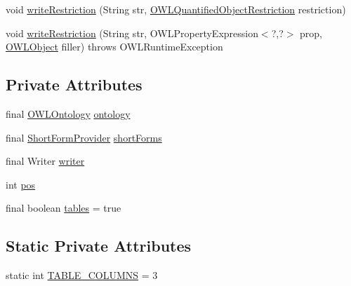 \begin{DoxyCompactItemize}
\item 
void \hyperlink{classuk_1_1ac_1_1manchester_1_1owl_1_1owlapi_1_1tutorialowled2011_1_1_o_w_l_tutorial_syntax_object_renderer_a53697d816997f4c2bdcb3e17cb0db5cc}{write\-Restriction} (String str, \hyperlink{interfaceorg_1_1semanticweb_1_1owlapi_1_1model_1_1_o_w_l_quantified_object_restriction}{O\-W\-L\-Quantified\-Object\-Restriction} restriction)
\item 
void \hyperlink{classuk_1_1ac_1_1manchester_1_1owl_1_1owlapi_1_1tutorialowled2011_1_1_o_w_l_tutorial_syntax_object_renderer_aca21aba92c5b7acac53d28a6ac6c66cf}{write\-Restriction} (String str, O\-W\-L\-Property\-Expression$<$?,?$>$ prop, \hyperlink{interfaceorg_1_1semanticweb_1_1owlapi_1_1model_1_1_o_w_l_object}{O\-W\-L\-Object} filler)  throws O\-W\-L\-Runtime\-Exception 
\end{DoxyCompactItemize}
\subsection*{Private Attributes}
\begin{DoxyCompactItemize}
\item 
final \hyperlink{interfaceorg_1_1semanticweb_1_1owlapi_1_1model_1_1_o_w_l_ontology}{O\-W\-L\-Ontology} \hyperlink{classuk_1_1ac_1_1manchester_1_1owl_1_1owlapi_1_1tutorialowled2011_1_1_o_w_l_tutorial_syntax_object_renderer_a8ecf6b5a156811b4fd6687fa5a99474c}{ontology}
\item 
final \hyperlink{interfaceorg_1_1semanticweb_1_1owlapi_1_1util_1_1_short_form_provider}{Short\-Form\-Provider} \hyperlink{classuk_1_1ac_1_1manchester_1_1owl_1_1owlapi_1_1tutorialowled2011_1_1_o_w_l_tutorial_syntax_object_renderer_a6a7a1b1bec7b17193bec82c11e896bd7}{short\-Forms}
\item 
final Writer \hyperlink{classuk_1_1ac_1_1manchester_1_1owl_1_1owlapi_1_1tutorialowled2011_1_1_o_w_l_tutorial_syntax_object_renderer_af9e3c9d1111b841a7e86b2ced68ff359}{writer}
\item 
int \hyperlink{classuk_1_1ac_1_1manchester_1_1owl_1_1owlapi_1_1tutorialowled2011_1_1_o_w_l_tutorial_syntax_object_renderer_a58e6c98acd19085e0c0671f150a96c89}{pos}
\item 
final boolean \hyperlink{classuk_1_1ac_1_1manchester_1_1owl_1_1owlapi_1_1tutorialowled2011_1_1_o_w_l_tutorial_syntax_object_renderer_abdeba02f3a15280c069224129565d778}{tables} = true
\end{DoxyCompactItemize}
\subsection*{Static Private Attributes}
\begin{DoxyCompactItemize}
\item 
static int \hyperlink{classuk_1_1ac_1_1manchester_1_1owl_1_1owlapi_1_1tutorialowled2011_1_1_o_w_l_tutorial_syntax_object_renderer_acbaafda46e9d9710f2cb4f9f6e8d07db}{T\-A\-B\-L\-E\-\_\-\-C\-O\-L\-U\-M\-N\-S} = 3
\end{DoxyCompactItemize}


